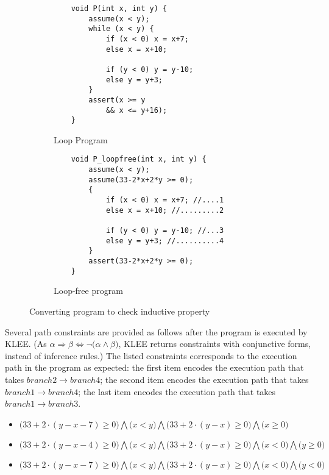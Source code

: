 \begin{figure}[!h]
\begin{subfigure}{0.48\textwidth}
    \centering
    {\scriptsize\begin{verbatim}
    void P(int x, int y) {
        assume(x < y);
        while (x < y) {
            if (x < 0) x = x+7;
            else x = x+10;
    
            if (y < 0) y = y-10;
            else y = y+3; 
        }
        assert(x >= y
            && x <= y+16);
    }
    \end{verbatim}}
    \vspace{-5mm}
    \caption{Loop Program}
    \label{fig:klee:program:in}
\end{subfigure}%
\begin{subfigure}{.48\textwidth}
      \centering
      \vspace{-0.1cm}
        {\scriptsize\begin{verbatim}
    void P_loopfree(int x, int y) {
        assume(x < y);
        assume(33-2*x+2*y >= 0);
        {
            if (x < 0) x = x+7; //....1
            else x = x+10; //.........2
    
            if (y < 0) y = y-10; //...3
            else y = y+3; //..........4
        }
        assert(33-2*x+2*y >= 0);
    }
    \end{verbatim}}
    \vspace{-5mm}
    \caption{Loop-free program}
      \label{fig:klee:program:out}
\end{subfigure}
\caption{Converting program to check inductive property}
\label{fig:klee:program}
\end{figure}

Several path constraints are provided as follows after the program is executed by KLEE.
(As $\alpha \Rightarrow \beta \Longleftrightarrow \neg \big(\alpha \wedge \beta\big)$, 
KLEE returns constraints with conjunctive forms, instead of inference rules.)
The listed constraints corresponds to the execution path in the program as expected:
the first item encodes the execution path that takes $branch2 \to branch4$;
the second item encodes the execution path that takes $branch1 \to branch4$;
the last item encodes the execution path that takes $branch1 \to branch3$.

\begin{itemize}
\item $\big(33+2\cdot(y-x-7)\ge0\big) \bigwedge \big(x<y\big) \bigwedge \big(33+2\cdot(y-x)\ge0\big) \bigwedge \big(x\ge0\big)$
\item $\big(33+2\cdot(y-x-4)\ge0\big) \bigwedge \big(x<y\big) \bigwedge \big(33+2\cdot(y-x)\ge0\big) \bigwedge \big(x<0\big) \bigwedge \big(y\ge0\big)$
\item $\big(33+2\cdot(y-x-7)\ge0\big) \bigwedge \big(x<y\big) \bigwedge \big(33+2\cdot(y-x)\ge0\big) \bigwedge \big(x<0\big) \bigwedge \big(y<0\big)$
\end{itemize}



